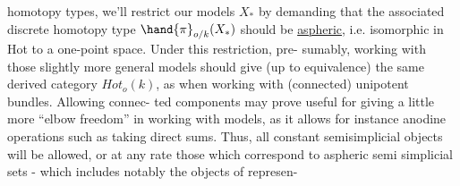 homotopy types,  we'll restrict our models $X_{*}$ by demanding that the
associated discrete homotopy type $\hand{\pi}_{o/k}(X_{*})$  should be \uline{aspheric},  i.e.
isomorphic in Hot to a one-point space.  Under this restriction,  pre-%
sumably,  working with those slightly more general models should give
(up to equivalence) the same derived category $Hot_o(k)$,  as when working
with (connected) unipotent bundles.   Allowing connec-%
ted components may prove useful for giving a little more ``elbow freedom''
in working with models,  as it allows for instance anodine operations
such as taking direct sums.  Thus,  all constant semisimplicial objects
will be allowed,  or at any rate those which correspond to aspheric semi
simplicial sets  -  which includes notably the objects of \hand{$\Delta^{\wedge}$} represen-%

